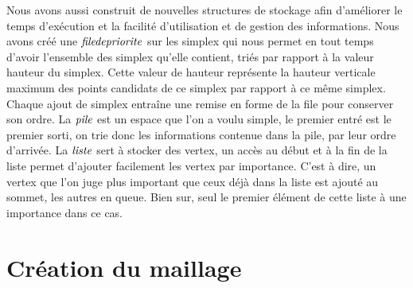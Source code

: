 \documentclass[10pt,a4paper]{report}
\begin{document}
\hspace*{10mm}Nous avons aussi construit de nouvelles structures de stockage afin d'améliorer le temps d'exécution et la facilité d'utilisation et de gestion des informations.
\newline \newline		%
\hspace*{10mm}Nous avons créé une $\it{file de priorite}$ sur les simplex qui nous permet en tout temps d'avoir l'ensemble des simplex qu'elle contient, triés par rapport à la valeur hauteur du simplex. Cette valeur de hauteur représente la hauteur verticale maximum des points candidats de ce simplex par rapport à ce même simplex. Chaque ajout de simplex entraîne une remise en forme de la file pour conserver son ordre.		
\newline \newline		%
\hspace*{10mm}La $\it{pile}$ est un espace que l'on a voulu simple, le premier entré est le premier sorti, on trie donc les informations contenue dans la pile, par leur ordre d'arrivée.
\newline \newline		%
\hspace*{10mm}La $\it{liste}$ sert à stocker des vertex, un accès au début et à la fin de la liste permet d'ajouter facilement les vertex par importance. C'est à dire, un vertex que l'on juge plus important que ceux déjà dans la liste est ajouté au sommet, les autres en queue. Bien sur, seul le premier élément de cette liste à une importance dans ce cas.
		
\chapter{Création du maillage}
	
\end{document}
